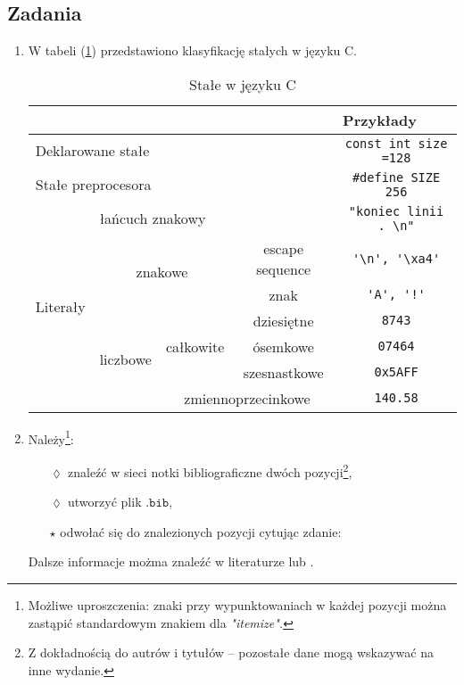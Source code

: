 \documentclass[a4paper, 11pt]{article}
\begin{document}
\subsection{Zadania}
\begin{enumerate}
\item {W tabeli (\ref{tab}) przedstawiono klasyfikację stałych w języku C.

\begin{table}[!h]
\caption{Stałe w języku C}
\label{tab}
\begin{center}
\begin{tabular}{|c|c|c|c|c|}

\cline{5-5}
\multicolumn{4}{l|}{}&\multicolumn{1}{l|}{Przykłady} \\
\hline
\multicolumn{4}{|l|}{Deklarowane stałe} & \verb!const int size =128! \\
\hline
\multicolumn{4}{|l|}{Stałe preprocesora} & \verb!#define SIZE 256! \\
\hline
\multirow{7}{*}{Literały} & \multicolumn{3}{|l|}{łańcuch znakowy} & \verb!"koniec linii . \n"! \\

 \cline{2-5}& \multicolumn{2}{c|}{\multirow{2}{*}{znakowe}} & escape sequence & \verb!'\n', '\xa4'!\\
\cline{4-5} &&& znak & \verb|'A', '!'|\\  
\cline{2-5}&\multirow{4}{*}{liczbowe}&\multirow{3}{*}{całkowite}& dziesiętne & \verb!8743! \\
\cline{4-5}&&&ósemkowe&\verb!07464! \\
\cline{4-5}&&&szesnastkowe&\verb!0x5AFF! \\
\cline{3-5}&&\multicolumn{2}{|c|}{zmiennoprzecinkowe}& \verb!140.58!\\

\hline
\end{tabular}
\end{center}
\end{table}

}
\item {Należy\footnote{Możliwe uproszczenia: znaki przy wypunktowaniach w każdej pozycji można zastąpić standardowym znakiem dla {\em"itemize".}}:

\begin{itemize}
\item[$\lozenge$]{znaleźć w sieci notki bibliograficzne dwóch pozycji\footnote{Z dokładnością do autrów i tytułów -- pozostałe dane mogą wskazywać na inne wydanie.},
}
\item[$\lozenge$]{utworzyć plik $\mathtt{.bib}$,}
\item[$\star$]{odwołać się do znalezionych pozycji cytując zdanie:
}
\end{itemize}
{\centering Dalsze informacje możma znaleźć w literaturze \cite{kahneman2011thinking} lub \cite{kernighan2006c}.}
}
\end{enumerate}


\end{document}
